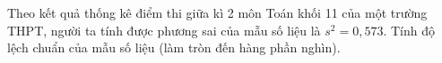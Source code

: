 \begin{ex}
Theo kết quả thống kê điểm thi giữa kì 2 môn Toán khối 11 của một trường THPT, người ta tính được phương sai của mẫu số liệu là $s^2=0{,}573$. Tính độ lệch chuẩn của mẫu số liệu (làm tròn đến hàng phần nghìn).
\end{ex}

